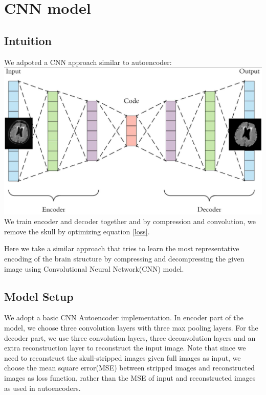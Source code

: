 \documentclass[conference]{IEEEtran}
\begin{document}
\section{CNN model}
\subsection*{Intuition}
We adpoted a CNN approach similar to autoencoder:
\includegraphics[scale = 0.3]{Snipaste_2018-05-28_14-16-23.png}
We train encoder and decoder together and by compression and convolution, we remove the skull by optimizing equation \ref{loss}. 

Here we take a similar approach that tries to learn the most representative encoding of the brain structure by compressing and decompressing the given image using Convolutional Neural Network(CNN) model. 

\subsection*{Model Setup}
We adopt a basic CNN Autoencoder implementation. In encoder part of the model, we choose three convolution layers with three max pooling layers. For the decoder part, we use three convolution layers, three deconvolution layers and an extra reconstruction layer to reconstruct the input image. Note that since we need to reconstruct the skull-stripped images given full images as input, we choose the mean square error(MSE) between stripped images and reconstructed images as loss function, rather than the MSE of input and reconstructed images as used in autoencoders.
\end{document}

